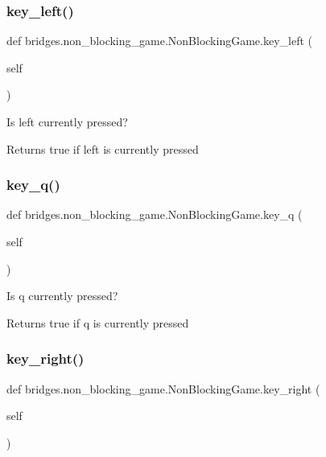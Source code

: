 \subsubsection{\texorpdfstring{key\_left()}{key\_left()}}
{\footnotesize\ttfamily def bridges.\+non\+\_\+blocking\+\_\+game.\+Non\+Blocking\+Game.\+key\+\_\+left (\begin{DoxyParamCaption}\item[{}]{self }\end{DoxyParamCaption})}



Is left currently pressed? 

\begin{DoxyReturn}{Returns}
true if left is currently pressed 
\end{DoxyReturn}
\mbox{\label{classbridges_1_1non__blocking__game_1_1_non_blocking_game_a75e94a930466b607828b6ef092f810d6}} 
\subsubsection{\texorpdfstring{key\_q()}{key\_q()}}
{\footnotesize\ttfamily def bridges.\+non\+\_\+blocking\+\_\+game.\+Non\+Blocking\+Game.\+key\+\_\+q (\begin{DoxyParamCaption}\item[{}]{self }\end{DoxyParamCaption})}



Is q currently pressed? 

\begin{DoxyReturn}{Returns}
true if q is currently pressed 
\end{DoxyReturn}
\mbox{\label{classbridges_1_1non__blocking__game_1_1_non_blocking_game_a31b6f78c39a93f0ba5350d346043bde9}} 
\subsubsection{\texorpdfstring{key\_right()}{key\_right()}}
{\footnotesize\ttfamily def bridges.\+non\+\_\+blocking\+\_\+game.\+Non\+Blocking\+Game.\+key\+\_\+right (\begin{DoxyParamCaption}\item[{}]{self }\end{DoxyParamCaption})}



